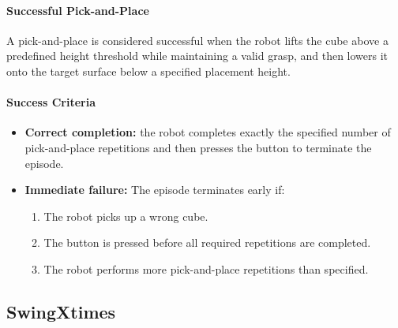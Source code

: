 \paragraph{Successful Pick-and-Place} A pick-and-place is considered successful when the robot lifts the cube above a predefined height threshold while maintaining a valid grasp, and then lowers it onto the target surface below a specified placement height.



\paragraph{Success Criteria}
\begin{itemize}[itemsep=1pt, topsep=0pt, leftmargin=*]
    \item \textbf{Correct completion:} the robot completes exactly the specified number of pick-and-place repetitions and then presses the button to terminate the episode.
    \item \textbf{Immediate failure:} The episode terminates early if:
        \begin{enumerate}[itemsep=1pt, topsep=0pt, leftmargin=*]
            \item The robot picks up a wrong cube.
            \item The button is pressed before all required repetitions are completed.
            \item The robot performs more pick-and-place repetitions than specified.
        \end{enumerate}
\end{itemize}

\clearpage



\subsection{SwingXtimes}
\label{sec:task_swingxtimes}

\begin{table}
    \centering
    \caption{\textit{SwingXtimes} Task Configuration.}
    \label{tab:swingxtimes_difficulty_config}
    \renewcommand{\arraystretch}{1.2}
 {   {}}
\end{table}

